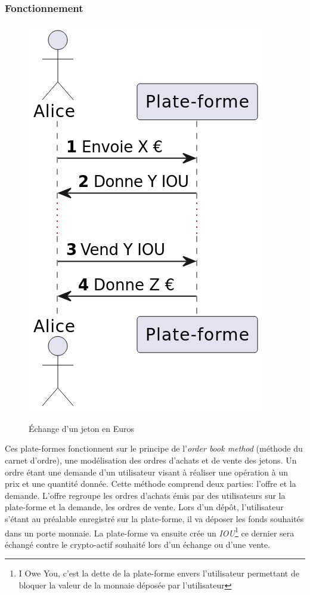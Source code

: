\subsubsection{Fonctionnement}
\begin{figure}[h!]
    \centering
    \includegraphics[scale=0.2]{centralisation/Achat-Vente.png}
    \label{fig:simplifiedcex}
    \caption{Échange d'un jeton en Euros}
\end{figure}
Ces plate-formes fonctionnent sur le principe de l'\textit{order book method} (méthode du carnet d'ordre\cite{orderBook}), une modélisation des ordres d'achats et de vente des jetons.
Un ordre étant une demande d'un utilisateur visant à réaliser une opération à un prix et une quantité donnée. 
Cette méthode comprend deux parties: l'offre et la demande. L'offre regroupe les ordres d'achats émis par des utilisateurs sur la plate-forme et la demande, les ordres de vente.
Lors d'un dépôt, l'utilisateur s'étant au préalable enregistré sur la plate-forme, il va déposer les fonds souhaités dans un porte monnaie. 
La plate-forme va ensuite crée un \textit{IOU}\footnote{I Owe You, c'est la dette de la plate-forme envers l'utilisateur permettant de bloquer la valeur de la monnaie déposée par l'utilisateur\cite{IOU}} 
ce dernier sera échangé contre le crypto-\gls{actif} souhaité lors d'un échange ou d'une vente. \\ 

